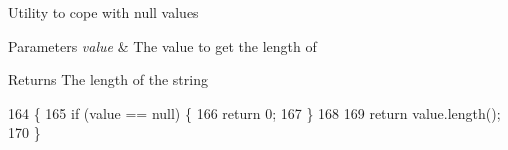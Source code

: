 Utility to cope with null values


\begin{DoxyParams}{Parameters}
{\em value} & The value to get the length of \\
\hline
\end{DoxyParams}
\begin{DoxyReturn}{Returns}
The length of the string 
\end{DoxyReturn}

\begin{DoxyCode}
164                                            \{
165         \textcolor{keywordflow}{if} (value == null) \{
166             \textcolor{keywordflow}{return} 0;
167         \}
168         
169         \textcolor{keywordflow}{return} value.length();
170     \}
\end{DoxyCode}
